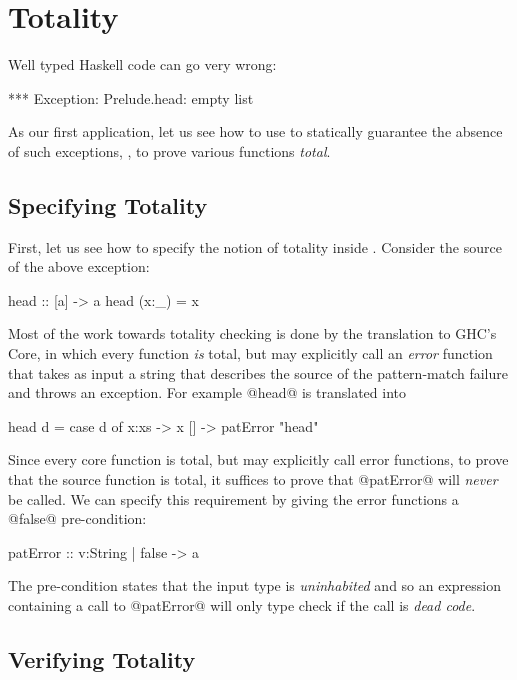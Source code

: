 \section{Totality}\label{sec:totality}
Well typed Haskell code can go very wrong:
%
\begin{code}
  *** Exception: Prelude.head: empty list
\end{code}
%
As our first application, let us see how to use 
\toolname to statically guarantee the absence
of such exceptions, \ie, to prove various 
functions \emph{total}.

\subsection{Specifying Totality}

First, let us see how to specify the notion of
totality inside \toolname. Consider the source of 
the above exception:
%
\begin{code}
  head :: [a] -> a
  head (x:_) = x
\end{code}
%
Most of the work towards totality checking is done by 
the translation to GHC's Core, in which every function 
\emph{is} total, but may explicitly call an \emph{error} 
function that takes as input a string that describes the 
source of the pattern-match failure and throws an exception.
%
For example @head@ is translated into
%
\begin{code}
  head d = case d of 
             x:xs -> x
             []   -> patError "head"
\end{code}

Since every core function is total, but may explicitly 
call error functions, to prove that the source function is 
total, it suffices to prove that @patError@ 
will \emph{never} be called.
%
We can specify this requirement by giving the error 
functions a @false@ pre-condition:
%
\begin{code}
  patError :: {v:String | false } -> a
\end{code}
%
The pre-condition states that the input type is \emph{uninhabited}
and so an expression containing a call to @patError@ will only type 
check if the call is \emph{dead code}.


\subsection{Verifying Totality}

